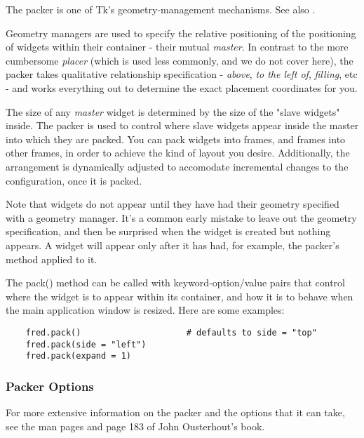 The packer is one of Tk's geometry-management mechanisms.  See also
.

Geometry managers are used to specify the relative positioning of the
positioning of widgets within their container - their mutual
\emph{master}.  In contrast to the more cumbersome \emph{placer}
(which is used less commonly, and we do not cover here), the packer
takes qualitative relationship specification - \emph{above}, \emph{to
the left of}, \emph{filling}, etc - and works everything out to
determine the exact placement coordinates for you. 

The size of any \emph{master} widget is determined by the size of
the "slave widgets" inside.  The packer is used to control where slave
widgets appear inside the master into which they are packed.  You can
pack widgets into frames, and frames into other frames, in order to
achieve the kind of layout you desire.  Additionally, the arrangement
is dynamically adjusted to accomodate incremental changes to the
configuration, once it is packed.

Note that widgets do not appear until they have had their geometry
specified with a geometry manager.  It's a common early mistake to
leave out the geometry specification, and then be surprised when the
widget is created but nothing appears.  A widget will appear only
after it has had, for example, the packer's  method
applied to it.

The pack() method can be called with keyword-option/value pairs that
control where the widget is to appear within its container, and how it
is to behave when the main application window is resized.  Here are
some examples:

\begin{verbatim}
    fred.pack()                     # defaults to side = "top"
    fred.pack(side = "left")
    fred.pack(expand = 1)
\end{verbatim}


\subsubsection{Packer Options}

For more extensive information on the packer and the options that it
can take, see the man pages and page 183 of John Ousterhout's book.

